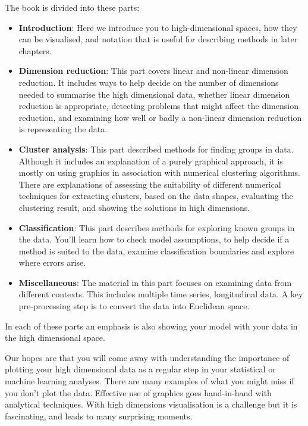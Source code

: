 \documentclass[
  letterpaper,
]{book}
\providecommand{\tightlist}{%
  \setlength{\itemsep}{0pt}\setlength{\parskip}{0pt}}\usepackage{longtable,booktabs,array}
\begin{document}
The book is divided into these parts:

\begin{itemize}
\tightlist
\item
  \textbf{Introduction}: Here we introduce you to high-dimensional
  spaces, how they can be visualised, and notation that is useful for
  describing methods in later chapters.\\
\item
  \textbf{Dimension reduction}: This part covers linear and non-linear
  dimension reduction. It includes ways to help decide on the number of
  dimensions needed to summarise the high dimensional data, whether
  linear dimension reduction is appropriate, detecting problems that
  might affect the dimension reduction, and examining how well or badly
  a non-linear dimension reduction is representing the data.
\item
  \textbf{Cluster analysis}: This part described methods for finding
  groups in data. Although it includes an explanation of a purely
  graphical approach, it is mostly on using graphics in association with
  numerical clustering algorithms. There are explanations of assessing
  the suitability of different numerical techniques for extracting
  clusters, based on the data shapes, evaluating the clustering result,
  and showing the solutions in high dimensions.
\item
  \textbf{Classification}: This part describes methods for exploring
  known groups in the data. You'll learn how to check model assumptions,
  to help decide if a method is suited to the data, examine
  classification boundaries and explore where errors arise.
\item
  \textbf{Miscellaneous}: The material in this part focuses on examining
  data from different contexts. This includes multiple time series,
  longitudinal data. A key pre-processing step is to convert the data
  into Euclidean space.
\end{itemize}

In each of these parts an emphasis is also showing your model with your
data in the high dimensional space.

Our hopes are that you will come away with understanding the importance
of plotting your high dimensional data as a regular step in your
statistical or machine learning analyses. There are many examples of
what you might miss if you don't plot the data. Effective use of
graphics goes hand-in-hand with analytical techniques. With high
dimensions visualisation is a challenge but it is fascinating, and leads
to many surprising moments.
\end{document}

